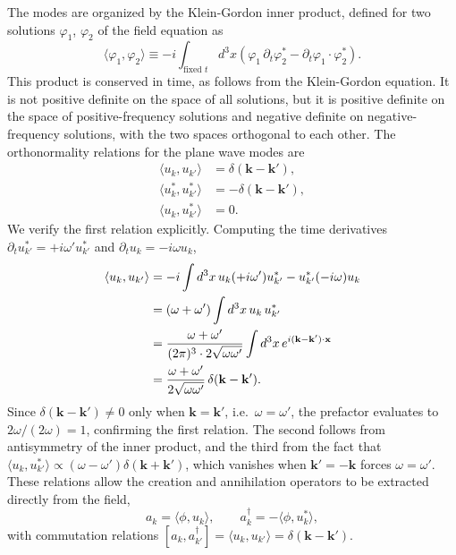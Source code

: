 The modes are organized by the Klein-Gordon inner product, defined for
two solutions $\varphi_1$, $\varphi_2$ of the field equation as
\begin{equation}
	\langle\varphi_1,\varphi_2\rangle
	\equiv -i\int_{\text{fixed }t}d^3x
	\left(\varphi_1\,\partial_t\varphi_2^*
	- \partial_t\varphi_1\cdot\varphi_2^*\right).
\end{equation}
This product is conserved in time, as follows from the Klein-Gordon
equation. It is not positive definite on the space of all solutions,
but it is positive definite on the space of positive-frequency
solutions and negative definite on negative-frequency solutions, with
the two spaces orthogonal to each other. The orthonormality relations
for the plane wave modes are
\begin{align}
	\langle u_k, u_{k'}\rangle     & = \delta(\mathbf{k}-\mathbf{k}'),  \\
	\langle u_k^*, u_{k'}^*\rangle & = -\delta(\mathbf{k}-\mathbf{k}'), \\
	\langle u_k, u_{k'}^*\rangle   & = 0.
\end{align}
We verify the first relation explicitly. Computing the time derivatives
$\partial_t u_{k'}^* = +i\omega' u_{k'}^*$ and
$\partial_t u_k = -i\omega u_k$,
\begin{align}
	\langle u_k, u_{k'}\rangle
	 & = -i\int d^3x\,u_k(+i\omega')u_{k'}^*
	- u_{k'}^*(-i\omega)u_k \notag                                  \\
	 & = (\omega+\omega')\int d^3x\,u_k\,u_{k'}^* \notag            \\
	 & = \frac{\omega+\omega'}{(2\pi)^3\cdot 2\sqrt{\omega\omega'}}
	\int d^3x\,e^{i(\mathbf{k}-\mathbf{k}')\cdot\mathbf{x}} \notag  \\
	 & = \frac{\omega+\omega'}{2\sqrt{\omega\omega'}}
	\,\delta(\mathbf{k}-\mathbf{k}').
\end{align}
Since $\delta(\mathbf{k}-\mathbf{k}')\neq 0$ only when
$\mathbf{k}=\mathbf{k}'$, i.e.\ $\omega=\omega'$, the prefactor
evaluates to $2\omega/(2\omega) = 1$, confirming the first relation.
The second follows from antisymmetry of the inner product, and the
third from the fact that
$\langle u_k,u_{k'}^*\rangle \propto (\omega-\omega')
	\delta(\mathbf{k}+\mathbf{k}')$, which vanishes when
$\mathbf{k}'=-\mathbf{k}$ forces $\omega=\omega'$. These relations
allow the creation and annihilation operators to be extracted directly
from the field,
\begin{equation}
	a_k = \langle\phi, u_k\rangle, \qquad
	a_k^\dagger = -\langle\phi, u_k^*\rangle,
\end{equation}
with commutation relations $[a_k, a_{k'}^\dagger]
	= \langle u_k, u_{k'}\rangle = \delta(\mathbf{k}-\mathbf{k}')$.

